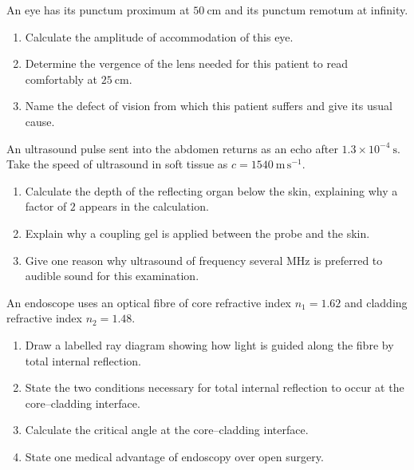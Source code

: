 \documentclass[11pt]{article}
\begin{document}
\begin{exercice}
An eye has its punctum proximum at $50\ \mathrm{cm}$ and its punctum remotum at infinity.
\begin{enumerate}
\item Calculate the amplitude of accommodation of this eye.
\item Determine the vergence of the lens needed for this patient to read comfortably at $25\ \mathrm{cm}$.
\item Name the defect of vision from which this patient suffers and give its usual cause.
\end{enumerate}
\end{exercice}

\begin{exercice}
An ultrasound pulse sent into the abdomen returns as an echo after $1.3 \times 10^{-4}\ \mathrm{s}$. Take the speed of ultrasound in soft tissue as $c = 1540\ \mathrm{m\,s^{-1}}$.
\begin{enumerate}
\item Calculate the depth of the reflecting organ below the skin, explaining why a factor of $2$ appears in the calculation.
\item Explain why a coupling gel is applied between the probe and the skin.
\item Give one reason why ultrasound of frequency several $\mathrm{MHz}$ is preferred to audible sound for this examination.
\end{enumerate}
\end{exercice}

\begin{exercice}
An endoscope uses an optical fibre of core refractive index $n_1 = 1.62$ and cladding refractive index $n_2 = 1.48$.
\begin{enumerate}
\item Draw a labelled ray diagram showing how light is guided along the fibre by total internal reflection.
\item State the two conditions necessary for total internal reflection to occur at the core--cladding interface.
\item Calculate the critical angle at the core--cladding interface.
\item State one medical advantage of endoscopy over open surgery.
\end{enumerate}
\end{exercice}
\end{document}
